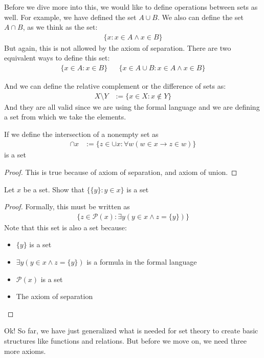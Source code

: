 \documentclass{tufte-handout}
\begin{document}
Before we dive more into this, we would like to define operations between sets as well. For example, we have defined the set $A \cup B$. We also can define the set $A \cap B$, as we think as the set:
\begin{align*}
	\{x: x \in A \wedge x \in B\}
\end{align*}
But again, this is not allowed by the axiom of separation. There are two equivalent ways to define this set:
\begin{align*}
	\{x \in A: x \in B\} && \{x \in A \cup B: x \in A \wedge x \in B\}
\end{align*}

And we can define the relative complement or the difference of sets as:
\begin{align*}
	X \setminus Y &:= \{x \in X: x \not\in Y\}
\end{align*}
And they are all valid since we are using the formal language and we are defining a set from which we take the elements. 

\begin{theorem}
	If we define the intersection of a nonempty set as
	\begin{align*}
		\cap x &:= \{z \in \cup x: \forall w(w \in x \rightarrow z \in w)\}
	\end{align*}
	is a set
\end{theorem}
\begin{proof}
	This is true because of axiom of separation, and axiom of union.
\end{proof}
\begin{problem}
	Let $x$ be a set. Show that $\{\{y\}: y \in x\}$ is a set
\end{problem}
\begin{proof}
	Formally, this must be written as 
	\begin{align*}
		\{z \in \mathcal{P}(x): \exists y (y \in x \wedge z = \{y\})\}
	\end{align*}
	Note that this set is also a set because:
	\begin{itemize}
		\item $\{y\}$ is a set
		\item $\exists y(y \in x \wedge z = \{y\})$ is a formula in the formal language
		\item $\mathcal{P}(x)$ is a set
		\item The axiom of separation
	\end{itemize}
\end{proof}

Ok! So far, we have just generalized what is needed for set theory to create basic structures like functions and relations. But before we move on, we need three more axioms.
\end{document}
